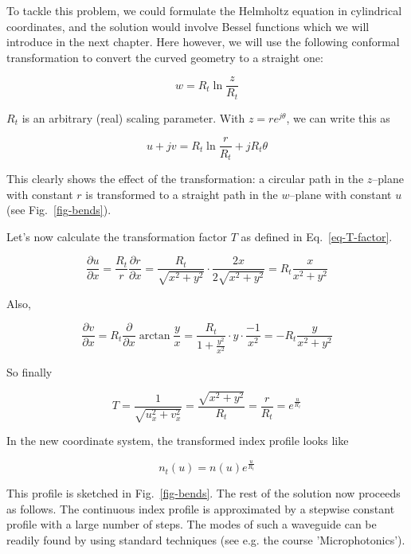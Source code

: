 To tackle this problem, we could formulate the Helmholtz equation in cylindrical
coordinates, and the solution would involve Bessel functions which we will
introduce in the next chapter. Here however, we will use the following conformal
transformation to convert the curved geometry to a straight one:

\begin{equation}
w = R_t \ln \frac{z}{R_t}
\end{equation} 

$R_t$ is an arbitrary (real) scaling parameter. With $z=r e^{j \theta}$, we can
write this as

\begin{equation}
u + jv = R_t \ln \frac{r}{R_t} + j R_t \theta
\end{equation} 

This clearly shows the effect of the transformation: a circular path in the
$z$--plane with constant $r$ is transformed to a straight path in the $w$--plane
with constant $u$ (see Fig.~\ref{fig-bends}).

Let's now calculate the transformation factor $T$ as defined in
Eq.~\ref{eq-T-factor}.

\begin{equation}
\frac{\partial u}{\partial x} = \frac{R_t}{r}\frac{\partial r}{\partial x} = 
\frac{R_t}{\sqrt{x^2+y^2}} \cdot \frac{2x}{2\sqrt{x^2+y^2}} = R_t
\frac{x}{x^2+y^2}
\end{equation} 

Also,

\begin{equation}
\frac{\partial v}{\partial x} = R_t \frac{\partial}{\partial x} \arctan
\frac{y}{x} = \frac{R_t}{1 + \frac{y^2}{x^2}} \cdot y \cdot \frac{-1}{x^2}= -R_t
\frac{y}{x^2+y^2}
\end{equation} 

So finally

\begin{equation}
T = \frac{1}{\sqrt{u_x^2+v_x^2}} = \frac{\sqrt{x^2+y^2}}{R_t} =
\frac{r}{R_t}=e^{\frac{u}{R_t}}
\end{equation} 

In the new coordinate system, the transformed index profile looks like

\begin{equation}
n_t(u) = n(u)e^{\frac{u}{R_t}}
\end{equation} 

This profile is sketched in Fig.~\ref{fig-bends}. The rest of the solution now
proceeds as follows. The continuous index profile is approximated by a stepwise
constant profile with a large number of steps. The modes of such a waveguide can
be readily found by using standard techniques (see e.g. the course
'Microphotonics').

